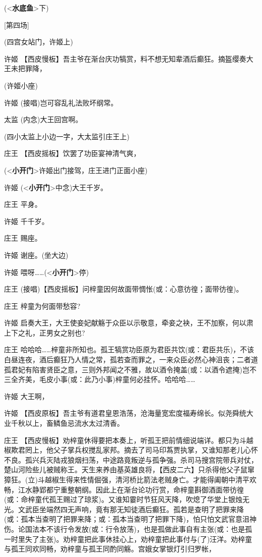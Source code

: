 (\textless{}\textbf{水底鱼}\textgreater{}下)

{[}第四场{]}

(四宫女站门，许姬上)

许姬
【西皮慢板】吾主爷在渐台庆功犒赏，料不想无知辈酒后癫狂。摘盔缨奏大王未把罪降，

(许姬小座)

许姬 (接唱)岂可容乱礼法败坏纲常。

太监 (内念)大王回宫啊。

(四小太监上小边一字，大太监引庄王上)

庄王 【西皮摇板】饮罢了功臣宴神清气爽，

(\textless{}\textbf{小开门}\textgreater{}许姬出门接驾，庄王进门正面小座)

许姬 (\textless{}\textbf{小开门}\textgreater{}中念)大王千岁。

庄王 平身。

许姬 千千岁。

庄王 赐座。

许姬 谢座。(坐大边)

许姬 喂呀\ldots{}\ldots{}(\textless{}\textbf{小开门}\textgreater{}停)

庄王 (接唱)【西皮摇板】问梓童因何故面带惆怅(或：心意彷徨；面带彷徨)。

庄王 梓童为何面带愁容?

许姬
启奏大王，大王使妾妃献觞于众臣以示敬意，牵妾之袂，王不加察，何以肃上下之礼，正男女之别也?

庄王
哈哈哈\ldots{}\ldots{}梓童非所知也。孤王犒赏功臣原为君臣共饮(或：君臣共乐)，不该白昼连夜，酒后癫狂乃人情之常，孤若查而罪之，一来众臣必然心神沮丧；二者道孤君妃有陷害贤臣之意，三则外邦闻之不雅，故以酒令掩盖(或：以酒令遮掩)岂不三全齐美，毛皮小事(或：此乃小事)梓童何必挂怀。哈哈哈\ldots{}\ldots{}

许姬 大王啊，

许姬
【西皮原板】吾主爷有道君皇恩浩荡，沧海量宽宏度福寿绵长。似尧舜统大业千秋以上，畜鳞鱼忌流水太过清香。

庄王
【西皮慢板】劝梓童休得要把本奏上，听孤王把前情细说端详。都只为斗越椒欺君罔上，他父子掌兵权搅乱家邦。摘去了司马印蒍贾执掌，又谁知那老儿心怀不良。孤兴兵灭陆戎狼烟扫荡，中途路竟叛逆与孤争强。杀司马搜宫院带兵对仗，楚山河险些儿被贼称王。天生来养由基英雄良将，【西皮二六】只杀得他父子鼠窜獐狂。(立)斗越椒生得来性情倔强，清河桥比箭法老贼身亡。才能得阖朝中清平欢畅，江水静郢都宁重整朝纲。因此上在渐台论功行赏，命梓童斟御酒面带彷徨(或：命梓童代孤王赐过了琼浆)。又谁知霎时节狂风天降，吹熄了华堂上银烛无光。文武臣坐端然四无声响，竟有那无知徒酒后癫狂。孤若是查明了把罪来降(或：孤本当查明了把罪来降；或：孤本当查明了把罪下降)，怕只怕文武官意沮神伤。论国法本不该行令发放(或：行令放荡)，也是孤做此事自有主张(或：也是孤一时里失了主张)。劝梓童把此事休挂心上，劝梓童把此事付与(了)汪洋。劝梓童与孤王同欢同畅，劝梓童与孤王同酌同觞。宫娥女掌银灯引归罗帐，

